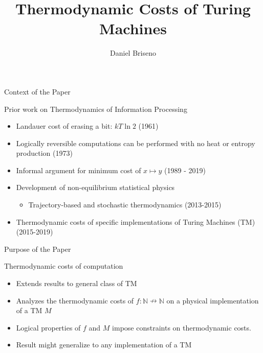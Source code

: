 \documentclass{beamer}
\title{Thermodynamic Costs of Turing Machines \parencite{Kolchinsky_2020}}
\author{Daniel Briseno}
\begin{document}
  \frame{\titlepage}
  
  

\begin{frame}{Context of the Paper}
\begin{block}{Prior work on Thermodynamics of Information Processing}
\begin{itemize}
    \item Landauer cost of erasing a bit: $kT\ln2$ (1961)
    \item Logically reversible computations can be performed with no heat or entropy production (1973)
    \item Informal argument for minimum cost of $x\mapsto y$ (1989 - 2019)
    \item Development of non-equilibrium statistical physics
    \begin{itemize}
        \item Trajectory-based and stochastic thermodynamics (2013-2015)
    \end{itemize}
    \item Thermodynamic costs of specific implementations of Turing Machines (TM)(2015-2019)
    
    
\end{itemize}
\end{block}
\end{frame}


  \begin{frame}{Purpose of the Paper}
    \begin{block}{Thermodynamic costs of computation}
    \begin{itemize}
        \item Extends results to general class of TM
        \item Analyzes the thermodynamic costs of $f:\mathbb{N} \nrightarrow \mathbb{N}$ on a physical implementation of a TM $M$
        \item Logical properties of $f$ and $M$ impose constraints on thermodynamic costs.
        \item Result might generalize to any implementation of a TM
    \end{itemize}
    \end{block}
\end{frame}
\end{document}
